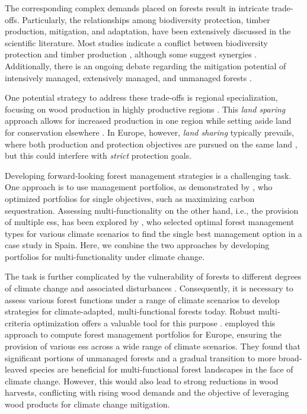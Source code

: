 \documentclass[]{article}
\begin{document}
The corresponding complex demands placed on forests result in intricate trade-offs. Particularly, the relationships among biodiversity protection, timber production, mitigation, and adaptation, have been extensively discussed in the scientific literature. Most studies indicate a conflict between biodiversity protection and timber production \parencite{Gutsch2018, Verkerk2014b, Felton2016, Baskent2023}, although some suggest synergies \parencite{Biber2020}. Additionally, there is an ongoing debate regarding the mitigation potential of intensively managed, extensively managed, and unmanaged forests \parencite{gregorQuantifyingImpactKey2024, Dugan2018, Soimakallio2021, Gustavsson2021, Petersson2022, Schulte2022, Roebroek2023, Peng2023}.


One potential strategy to address these trade-offs is regional specialization, focusing on wood production in highly productive regions \parencite[e.g.,][]{LessaDerciAugustynczik2021}. This \emph{land sparing} approach allows for increased production in one region while setting aside land for conservation elsewhere \parencite{Balmford2021}. In Europe, however, \emph{land sharing} typically prevails, where both production and protection objectives are pursued on the same land \parencite{Betts2021}, but this could interfere with \textit{strict} protection goals.


Developing forward-looking forest management strategies is a challenging task.
One approach is to use management portfolios, as demonstrated by \textcite{Luyssaert2018}, who optimized portfolios for single objectives, such as maximizing carbon sequestration. Assessing multi-functionality on the other hand, i.e., the provision of multiple \glspl{es}, has been explored by \textcite{Diaz-Balteiro2017}, who selected optimal forest management types for various climate scenarios to find the single best management option in a case study in Spain. Here, we combine the two approaches by developing portfolios for multi-functionality under climate change.


The task is further complicated by the vulnerability of forests to different degrees of climate change and associated disturbances \parencite{Spinoni2018, ipcc_summary_2013, Senf2021, Senf2021a}. Consequently, it is necessary to assess various forest functions under a range of climate scenarios to develop strategies for climate-adapted, multi-functional forests today. Robust multi-criteria optimization offers a valuable tool for this purpose  \parencite{BenTal2002, Groetzner2022, Uhde2017, Ishizaka2013a, Knoke2016}.
\textcite{Gregor2022} employed this approach to compute forest management portfolios for Europe, ensuring the provision of various \glspl{es} across a wide range of climate scenarios. They found that significant portions of unmanaged forests and a gradual transition to more broad-leaved species are beneficial for multi-functional forest landscapes in the face of climate change. However, this would also lead to strong reductions in wood harvests, conflicting with rising wood demands and the objective of leveraging wood products for climate change mitigation.
\end{document}
